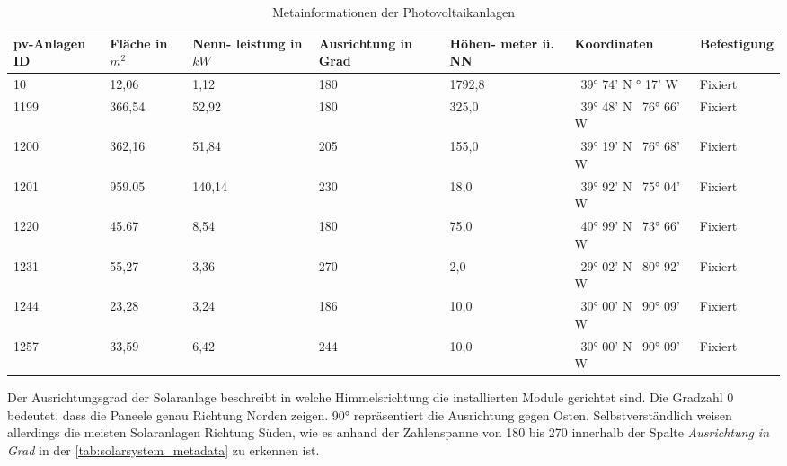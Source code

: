 \documentclass[12pt, a4paper]{article}
\begin{document}
\begin{table}
\begin{center}
\begin{tabular}{| p{1.5cm} | p{1.5cm} | p{1.5cm} | p{2.3cm}  | p{2cm} | p{2.2cm} | p{2cm} |}
\hline
\ac{pv}-Anlagen ID & Fläche in $m^2$ & Nenn- leistung in $kW$ & Ausrichtung in Grad & Höhen- meter ü. NN & Koordinaten & Befestigung \\ \hline
  10 &  12,06 &   1,12 & 180 & 1792,8 & \ 39° 74' N \newline   105° 17' W & Fixiert \\ \hline
1199 & 366,54 &  52,92 & 180 &  325,0 & \ 39° 48' N \newline \  76° 66' W & Fixiert \\ \hline
1200 & 362,16 &  51,84 & 205 &  155,0 & \ 39° 19' N \newline \  76° 68' W & Fixiert \\ \hline
1201 & 959.05 & 140,14 & 230 &   18,0 & \ 39° 92' N \newline \  75° 04' W & Fixiert \\ \hline
1220 &  45.67 &   8,54 & 180 &   75,0 & \ 40° 99' N \newline \  73° 66' W & Fixiert \\ \hline
1231 &  55,27 &   3,36 & 270 &    2,0 & \ 29° 02' N \newline \  80° 92' W & Fixiert \\ \hline
1244 &  23,28 &   3,24 & 186 &   10,0 & \ 30° 00' N \newline \  90° 09' W & Fixiert \\ \hline
1257 &  33,59 &   6,42 & 244 &   10,0 & \ 30° 00' N \newline \  90° 09' W & Fixiert \\ \hline

\end{tabular}
\end{center}
\caption{Metainformationen der Photovoltaikanlagen}
\label{tab:solarsystem_metadata} 
\end{table}

Der Ausrichtungsgrad der Solaranlage beschreibt in welche Himmelsrichtung die installierten Module gerichtet sind. Die Gradzahl 0 bedeutet, dass die Paneele genau Richtung Norden zeigen. 90° repräsentiert die Ausrichtung gegen Osten. Selbstverständlich weisen allerdings die meisten Solaranlagen Richtung Süden, wie es anhand der Zahlenspanne von 180 bis 270 innerhalb der Spalte \textit{Ausrichtung in Grad} in der \autoref{tab:solarsystem_metadata} zu erkennen ist.
\end{document}
